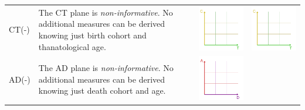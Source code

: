 \documentclass[12pt,oneside,a4paper]{article} %
\begin{document}
\begin{longtable}{m{}L{0.37\textwidth}m{0.17\textwidth}m{0.2\textwidth}}
  CT(-) &
  The CT plane is \emph{non-informative}. No additional measures can be derived
  knowing just birth cohort and thanatological age. &
  \includegraphics[scale=.5]{Figures/DiagramTable/CT_rt.pdf} & \includegraphics[scale=.5]{Figures/DiagramTable/CT_rt.pdf} \\
  AD(-) &
  The AD plane is \emph{non-informative}. No additional measures can be derived
  knowing just death cohort and age. & \includegraphics[scale=.5]{Figures/DiagramTable/AD_rt.pdf} &

\end{longtable}
\end{document}

